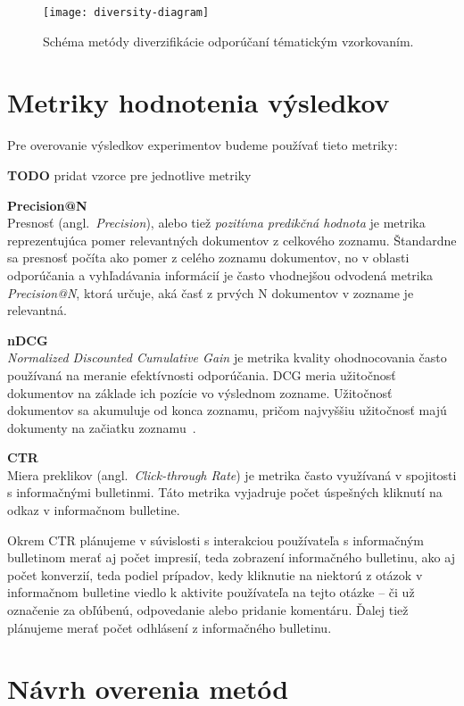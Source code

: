 \begin{figure}[H]\begin{center}
\texttt{[image: diversity-diagram]}
\caption{Schéma metódy diverzifikácie odporúčaní tématickým vzorkovaním.\label{fig:tematic-sampling}}\end{center}
\end{figure}


\section{Metriky hodnotenia výsledkov}

Pre overovanie výsledkov experimentov budeme používať tieto metriky:

\textbf{TODO} pridat vzorce pre jednotlive metriky

\textbf{Precision@N}\\
Presnosť (angl.~\emph{Precision}), alebo tiež \textit{pozitívna predikčná hodnota} je metrika reprezentujúca pomer relevantných
dokumentov z celkového zoznamu. Štandardne sa presnosť počíta ako pomer z celého zoznamu dokumentov, no v oblasti
odporúčania a vyhľadávania informácií je často vhodnejšou odvodená metrika \textit{Precision@N}, ktorá určuje, aká časť
z prvých N dokumentov v zozname je relevantná.

\textbf{nDCG}\\
\textit{Normalized Discounted Cumulative Gain} je metrika kvality ohodnocovania často používaná na meranie efektívnosti
odporúčania. DCG meria užitočnosť dokumentov na základe ich pozície vo výslednom zozname. Užitočnosť dokumentov sa akumuluje
od konca zoznamu, pričom najvyššiu užitočnosť majú dokumenty na začiatku zoznamu~\cite{Jrvelin2002}.

\textbf{CTR}\\
Miera preklikov (angl.~\emph{Click-through Rate}) je metrika často využívaná v spojitosti s informačnými bulletinmi.
Táto metrika vyjadruje počet úspešných kliknutí na odkaz v informačnom bulletine.

Okrem CTR plánujeme v súvislosti s interakciou používateľa s informačným bulletinom merať aj počet impresií,
teda zobrazení informačného bulletinu, ako aj počet konverzií, teda podiel prípadov, kedy kliknutie na niektorú z otázok
v informačnom bulletine viedlo k aktivite používateľa na tejto otázke -- či už označenie za obľúbenú,
odpovedanie alebo pridanie komentáru. Ďalej tiež plánujeme merať počet odhlásení z informačného bulletinu.


\section{Návrh overenia metód}

